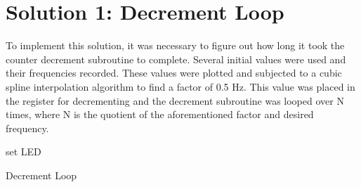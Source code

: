 \documentclass{article}
\begin{document}


%
%	



\section*{Solution 1:  Decrement Loop}

To implement this solution, it was necessary to figure out how long it took the counter decrement subroutine to complete. Several initial values were used and their frequencies recorded. These values were plotted and subjected to a cubic spline interpolation algorithm to find a factor of 0.5 Hz. This value was placed in the register for decrementing and the decrement subroutine was looped over N times, where N is the quotient of the aforementioned factor and desired frequency.


\begin{center}
	\begin{minipage}{0.6\linewidth} %
		\begin{algorithm}[H]
			\medskip
			set LED \;
			\caption{Decrement Loop} %
			\label{alg:DecLoop}   %
		\end{algorithm}
	\end{minipage}
\end{center}
\end{document}
